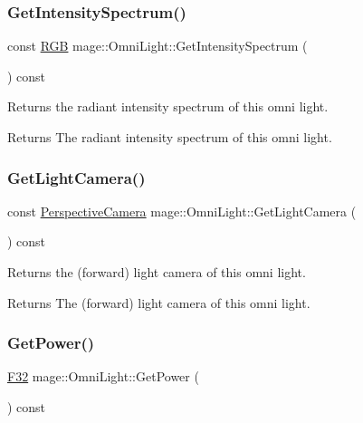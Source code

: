 \subsubsection{\texorpdfstring{Get\+Intensity\+Spectrum()}{GetIntensitySpectrum()}}
{\footnotesize\ttfamily const \hyperlink{structmage_1_1_r_g_b}{R\+GB} mage\+::\+Omni\+Light\+::\+Get\+Intensity\+Spectrum (\begin{DoxyParamCaption}{ }\end{DoxyParamCaption}) const\hspace{0.3cm}{\ttfamily [noexcept]}}

Returns the radiant intensity spectrum of this omni light.

\begin{DoxyReturn}{Returns}
The radiant intensity spectrum of this omni light. 
\end{DoxyReturn}
\hypertarget{classmage_1_1_omni_light_ac31708d7696a809bb75c75a85b14de80}{}\label{classmage_1_1_omni_light_ac31708d7696a809bb75c75a85b14de80} 
\subsubsection{\texorpdfstring{Get\+Light\+Camera()}{GetLightCamera()}}
{\footnotesize\ttfamily const \hyperlink{classmage_1_1_perspective_camera}{Perspective\+Camera} mage\+::\+Omni\+Light\+::\+Get\+Light\+Camera (\begin{DoxyParamCaption}{ }\end{DoxyParamCaption}) const\hspace{0.3cm}{\ttfamily [noexcept]}}

Returns the (forward) light camera of this omni light.

\begin{DoxyReturn}{Returns}
The (forward) light camera of this omni light. 
\end{DoxyReturn}
\hypertarget{classmage_1_1_omni_light_a13f9893ef0a19cbb08bfce557bb906fc}{}\label{classmage_1_1_omni_light_a13f9893ef0a19cbb08bfce557bb906fc} 
\subsubsection{\texorpdfstring{Get\+Power()}{GetPower()}}
{\footnotesize\ttfamily \hyperlink{namespacemage_aa97e833b45f06d60a0a9c4fc22ae02c0}{F32} mage\+::\+Omni\+Light\+::\+Get\+Power (\begin{DoxyParamCaption}{ }\end{DoxyParamCaption}) const\hspace{0.3cm}{\ttfamily [noexcept]}}

